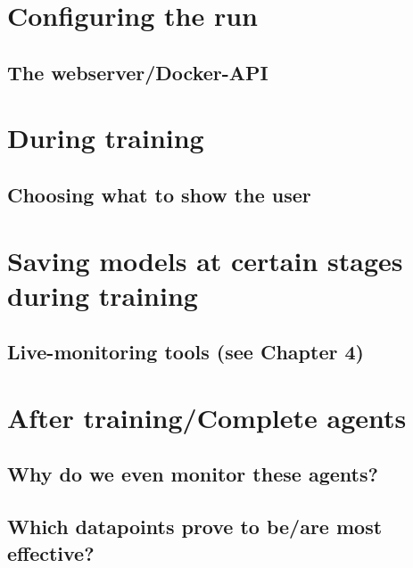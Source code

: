 \label{chapter:OurWorkflow}
\section{Configuring the run}
\subsection{The webserver/Docker-API}

\section{During training}
\subsection{Choosing what to show the user}
\section{Saving models at certain stages during training}
\subsection{Live-monitoring tools (see Chapter 4)}

\section{After training/Complete agents}
\subsection{Why do we even monitor these agents?}
\subsection{Which datapoints prove to be/are most effective?}